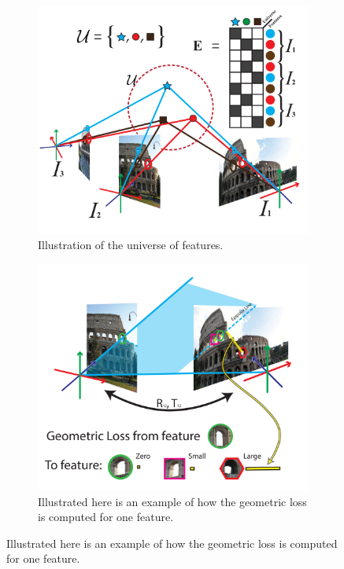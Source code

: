 \documentclass{article} %
\begin{document}
\begin{figure}[t]
\begin{subfigure}[b]{.45\linewidth}
  \centering
  \includegraphics[width=0.95\linewidth]{figures-UniverseOfFeatures-v2.pdf}
  \caption{Illustration of the universe of features.}
  \label{fig:1a}
  \label{fig:universefeatures}
\end{subfigure}%
\begin{subfigure}[b]{.45\linewidth}
  \centering
  \includegraphics[width=0.95\linewidth]{figures-GeometricConsistency-v2.pdf}
  \caption{Illustrated here is an example of how the geometric loss is computed for one feature.}

\end{subfigure}
\end{figure}
\end{document}
